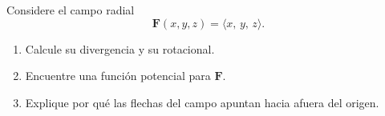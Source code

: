 Considere el campo radial
\[
\mathbf{F}(x,y,z)=\langle x,\,y,\,z\rangle.
\]
\begin{enumerate}
    \item Calcule su divergencia y su rotacional.
    \item Encuentre una función potencial para $\mathbf{F}$.
    \item Explique por qué las flechas del campo apuntan hacia afuera del origen.
\end{enumerate}
